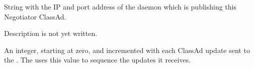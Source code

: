 \begin{description}
\item[\AdAttr{NegotiatorIpAddr}:] String with the IP and port address of the
 daemon which is publishing this Negotiator ClassAd.

\item[\AdAttr{PublicNetworkIpAddr}:] Description is not yet written.

\item[\AdAttr{UpdateSequenceNumber}:] An integer, starting at zero,
and incremented with each ClassAd update sent to the .
The  uses this value to sequence the updates it
receives.

\end{description}

